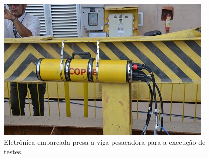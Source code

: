 \begin{figure}[h!]
  \centering
  \includegraphics[width=1\linewidth]{Fotos/JirauJunho2014/10.jpg}
  \caption{Eletrônica embarcada presa a viga pesacadora para a execução de
  testes.}
  \label{nov20134}
\end{figure}